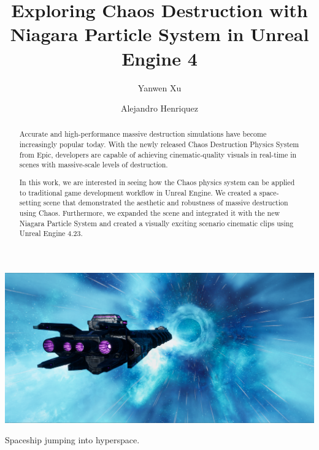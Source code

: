 \documentclass[sigconf]{acmart}
\begin{document}
\title{Exploring Chaos Destruction with Niagara Particle System in Unreal Engine 4}

\author{Yanwen Xu}

\author{Alejandro Henriquez}

\renewcommand{\shortauthors}{Xu and Henriquez}

\begin{abstract}
Accurate and high-performance massive destruction simulations have become increasingly popular today. With the newly released Chaos Destruction Physics System from Epic, developers are capable of achieving cinematic-quality visuals in real-time in scenes with massive-scale levels of destruction. 

In this work, we are interested in seeing how the Chaos physics system can be applied to traditional game development workflow in Unreal Engine. We created a space-setting scene that demonstrated the aesthetic and robustness of massive destruction using Chaos. Furthermore, we expanded the scene and integrated it with the new Niagara Particle System and created a visually exciting scenario cinematic clips using Unreal Engine 4.23. 

\end{abstract}


\begin{teaserfigure}
  \centering
  \includegraphics[width=6.0in]{aaafiles/teaser.png}
  \caption{Spaceship jumping into hyperspace. }
\end{teaserfigure}
\end{document}
